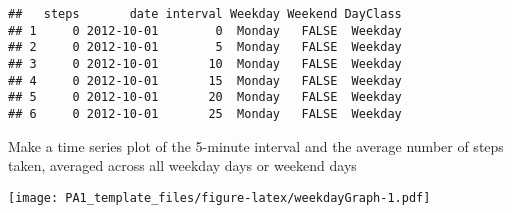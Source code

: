 \documentclass[
]{article}
\newenvironment{Shaded}{\begin{snugshade}}{\end{snugshade}}
\newcommand{\AttributeTok}[1]{\textcolor[rgb]{0.77,0.63,0.00}{#1}}
\newcommand{\ConstantTok}[1]{\textcolor[rgb]{0.00,0.00,0.00}{#1}}
\newcommand{\ControlFlowTok}[1]{\textcolor[rgb]{0.13,0.29,0.53}{\textbf{#1}}}
\newcommand{\DecValTok}[1]{\textcolor[rgb]{0.00,0.00,0.81}{#1}}
\newcommand{\FunctionTok}[1]{\textcolor[rgb]{0.00,0.00,0.00}{#1}}
\newcommand{\NormalTok}[1]{#1}
\newcommand{\OtherTok}[1]{\textcolor[rgb]{0.56,0.35,0.01}{#1}}
\newcommand{\SpecialCharTok}[1]{\textcolor[rgb]{0.00,0.00,0.00}{#1}}
\begin{document}
\begin{verbatim}
##   steps       date interval Weekday Weekend DayClass
## 1     0 2012-10-01        0  Monday   FALSE  Weekday
## 2     0 2012-10-01        5  Monday   FALSE  Weekday
## 3     0 2012-10-01       10  Monday   FALSE  Weekday
## 4     0 2012-10-01       15  Monday   FALSE  Weekday
## 5     0 2012-10-01       20  Monday   FALSE  Weekday
## 6     0 2012-10-01       25  Monday   FALSE  Weekday
\end{verbatim}

Make a time series plot of the 5-minute interval and the average number
of steps taken, averaged across all weekday days or weekend days

\begin{Shaded}
\end{Shaded}

\texttt{[image: PA1\_template\_files/figure-latex/weekdayGraph-1.pdf]}
\end{document}
